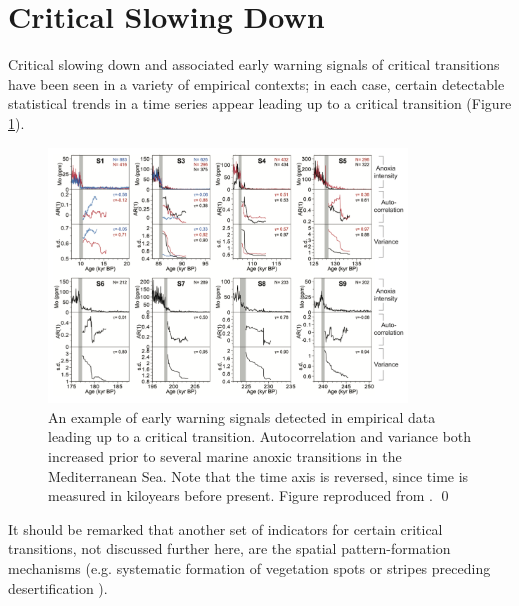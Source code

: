 \section{Critical Slowing Down}
\label{sec:csd}

Critical slowing down and associated early warning signals of critical transitions \cite{schefferCriticalTransitionsNature2009, boettigerEarlyWarningSignals2013, georgeEarlyWarningSignals2021} have been seen in a variety of empirical contexts; in each case, certain detectable statistical trends in a time series appear leading up to a critical transition (Figure \ref{fig:ews_example}). 

\begin{figure}[H]
	\centering
	\captionsetup{width=0.9\linewidth}
	\includegraphics[width=0.85\textwidth]{figs/ews_example_marine} 
	\caption{
		An example of early warning signals detected in empirical data leading up to a critical transition. Autocorrelation and variance both increased prior to several marine anoxic transitions in the Mediterranean Sea. Note that the time axis is reversed, since time is measured in kiloyears before present. Figure reproduced from \cite{hennekamEarlyWarningSignalsMarine2020}. \qed}
	\label{fig:ews_example}
\end{figure}

It should be remarked that another set of indicators for certain critical transitions, not discussed further here, are the spatial pattern-formation mechanisms (e.g. systematic formation of vegetation spots or stripes preceding desertification \cite{dakosSlowingSpatiallyPatterned2011, bastiaansenStablePlanarVegetation2019}). 


